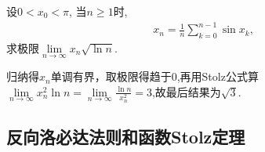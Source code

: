 \documentclass[../../main.tex]{subfiles}%
\begin{document}
\begin{example}
设$0<x_0<\pi$, 当$n\geqslant 1$时,
\begin{align*}
x_n = \frac{1}{n}\sum_{k=0}^{n-1} \sin x_k,
\end{align*}
求极限$\lim\limits_{n\to\infty} x_n\sqrt{\ln n}$.
\end{example}
\begin{solution}
归纳得$x_n$单调有界，取极限得趋于0,再用Stolz公式算$\underset{n\rightarrow \infty}{\lim}x_{n}^{2}\ln n=\underset{n\rightarrow \infty}{\lim}\frac{\ln n}{x_{n}^{2}}=3$,故最后结果为$\sqrt{3}$.

\end{solution}


\subsection{反向洛必达法则和函数Stolz定理}
\end{document}
